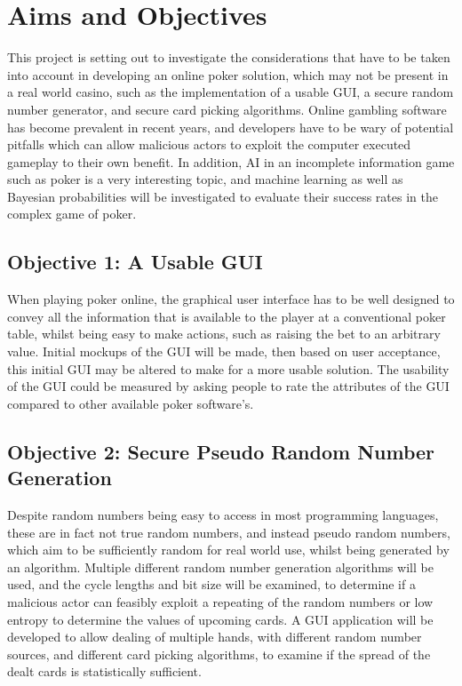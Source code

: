 \section{Aims and Objectives}
This project is setting out to investigate the considerations that have to be
taken into account in developing an online poker solution, which may not be
present in a real world casino, such as the implementation of a usable GUI, 
a secure random number generator, and secure card picking algorithms. Online 
gambling software has become prevalent in recent years, and developers have to 
be wary of potential pitfalls which can allow malicious actors to exploit the 
computer executed gameplay to their own benefit. In addition, AI in an
incomplete information game such as poker is a very interesting topic, and
machine learning as well as Bayesian probabilities will be investigated to
evaluate their success rates in the complex game of poker.

\subsection{Objective 1: A Usable GUI}
When playing poker online, the graphical user interface has to be well designed
to convey all the information that is available to the player at a conventional
poker table, whilst being easy to make actions, such as raising the bet to
an arbitrary value. Initial mockups of the GUI will be made, then based on
user acceptance, this initial GUI may be altered to make for a more usable
solution. The usability of the GUI could be measured by asking people to rate
the attributes of the GUI compared to other available poker software's.

\subsection{Objective 2: Secure Pseudo Random Number Generation}
Despite random numbers being easy to access in most programming languages, 
these are in fact not true random numbers, and instead pseudo random numbers, 
which aim to be sufficiently random for real world use, whilst being generated 
by an algorithm. Multiple different random number generation algorithms will
be used, and the cycle lengths and bit size will be examined, to determine if 
a malicious actor can feasibly exploit a repeating of the random numbers or 
low entropy to determine the values of upcoming cards. A GUI application will
be developed to allow dealing of multiple hands, with different random number
sources, and different card picking algorithms, to examine if the spread of
the dealt cards is statistically sufficient.

